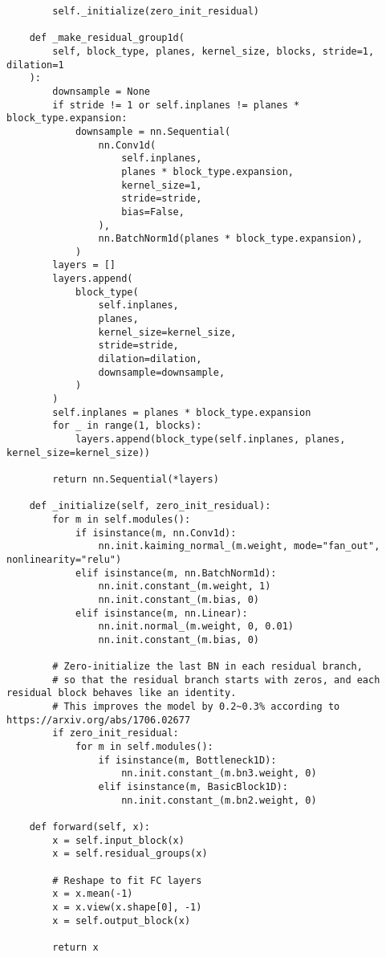 \documentclass[
thesis  %
]{csthes}
\begin{document}
\begin{lstlisting}
        self._initialize(zero_init_residual)

    def _make_residual_group1d(
        self, block_type, planes, kernel_size, blocks, stride=1, dilation=1
    ):
        downsample = None
        if stride != 1 or self.inplanes != planes * block_type.expansion:
            downsample = nn.Sequential(
                nn.Conv1d(
                    self.inplanes,
                    planes * block_type.expansion,
                    kernel_size=1,
                    stride=stride,
                    bias=False,
                ),
                nn.BatchNorm1d(planes * block_type.expansion),
            )
        layers = []
        layers.append(
            block_type(
                self.inplanes,
                planes,
                kernel_size=kernel_size,
                stride=stride,
                dilation=dilation,
                downsample=downsample,
            )
        )
        self.inplanes = planes * block_type.expansion
        for _ in range(1, blocks):
            layers.append(block_type(self.inplanes, planes, kernel_size=kernel_size))

        return nn.Sequential(*layers)

    def _initialize(self, zero_init_residual):
        for m in self.modules():
            if isinstance(m, nn.Conv1d):
                nn.init.kaiming_normal_(m.weight, mode="fan_out", nonlinearity="relu")
            elif isinstance(m, nn.BatchNorm1d):
                nn.init.constant_(m.weight, 1)
                nn.init.constant_(m.bias, 0)
            elif isinstance(m, nn.Linear):
                nn.init.normal_(m.weight, 0, 0.01)
                nn.init.constant_(m.bias, 0)

        # Zero-initialize the last BN in each residual branch,
        # so that the residual branch starts with zeros, and each residual block behaves like an identity.
        # This improves the model by 0.2~0.3% according to https://arxiv.org/abs/1706.02677
        if zero_init_residual:
            for m in self.modules():
                if isinstance(m, Bottleneck1D):
                    nn.init.constant_(m.bn3.weight, 0)
                elif isinstance(m, BasicBlock1D):
                    nn.init.constant_(m.bn2.weight, 0)

    def forward(self, x):
        x = self.input_block(x)
        x = self.residual_groups(x)

        # Reshape to fit FC layers
        x = x.mean(-1)
        x = x.view(x.shape[0], -1)
        x = self.output_block(x)

        return x


\end{lstlisting}
\end{document}
